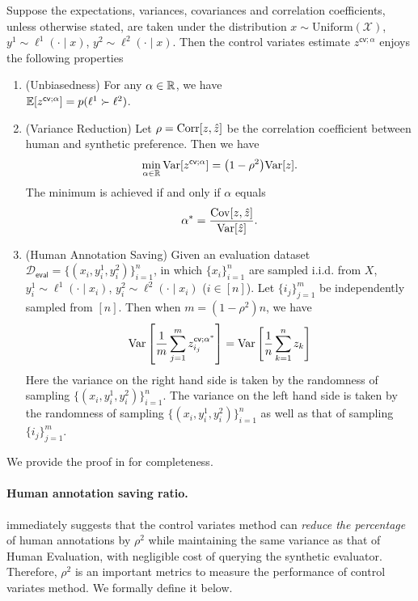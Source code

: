 \begin{proposition}
\label{prop:ctrl_var}

Suppose the expectations, variances, covariances and correlation coefficients, unless otherwise stated, are taken under the distribution $x \sim \mathrm{Uniform}(\mathcal{X})$, $y^1 \sim \ell^1(\cdot \mid x)$, $y^2 \sim \ell^2(\cdot \mid x)$. Then the control variates estimate $z^{\mathsf{cv}; \alpha}$ enjoys the following properties
\begin{enumerate}[label=(\arabic*)]
    \item (Unbiasedness) For any $\alpha \in\mathbb{R}$, we have \\
    $\mathbb E[z^{\mathsf{cv}; \alpha}] = p(\ell^1\succ \ell^2)$.
    \item (Variance Reduction) Let $\rho = \operatorname{\mathrm{Corr}}[z, \hat z]$ be the correlation coefficient between human and synthetic preference. Then we have 
    \begin{align*}
    \min_{\alpha \in \R}\var[z^{\mathsf{cv}; \alpha}] = \prn*{1-\rho^2} \var [z].
    \end{align*}
    The minimum is achieved if and only if $\alpha$ equals 
    \begin{align*}
    \alpha^* = \frac{\mathrm{Cov}[z, \hat z]}{\mathrm{Var}[\hat z]}.
    \end{align*}
    \item  (Human Annotation Saving)  Given an evaluation dataset $\mathcal{D_{\mathsf{eval}}} = \{(x_i, y_i^1, y_i^2)\}_{i=1}^n$, in which $\{x_i\}_{i=1}^n$ are sampled i.i.d. from $X$, $y_i^1 \sim \ell^1(\cdot \mid x_i)$, $y_i^2 \sim \ell^2(\cdot \mid x_i)$ ($i\in [n]$). Let $\{i_j\}_{j=1}^m$ be independently sampled from $[n]$. Then when $m = (1-\rho^2) n$, we have 
    \begin{align*}
    \mathrm{Var}\left[\frac{1}{m}\sum_{j=1}^m z^{\mathsf{cv}; \alpha^*}_{i_j}\right] = \mathrm{Var}\left[\frac{1}{n}\sum_{k=1}^n z_{k}\right]
    \end{align*}
    Here the variance on the right hand side is taken by the randomness of sampling $\{(x_i, y_i^1, y_i^2)\}_{i=1}^n$. The variance on the left hand side is taken by the randomness of sampling $\{(x_i, y_i^1, y_i^2)\}_{i=1}^n$ as well as that of sampling $\{i_j\}_{j=1}^m$.
\end{enumerate}
\end{proposition}
We provide the proof in  for completeness.

\paragraph{Human annotation saving ratio.}  immediately suggests that the control variates method can \emph{reduce the percentage} of human annotations by $\rho^2$ while maintaining the same variance as that of Human Evaluation, with negligible cost of querying the synthetic evaluator. Therefore, $\rho^2$ is an important metrics to measure the performance of control variates method. We formally define it below.

